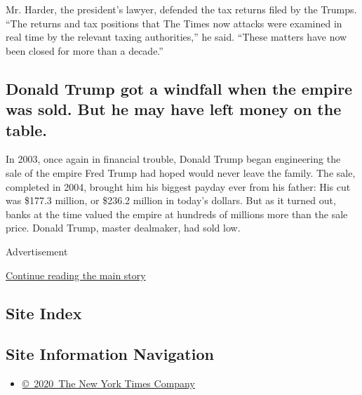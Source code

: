 Mr. Harder, the president's lawyer, defended the tax returns filed by
the Trumps. ``The returns and tax positions that The Times now attacks
were examined in real time by the relevant taxing authorities,'' he
said. ``These matters have now been closed for more than a decade.''

\hypertarget{donald-trump-got-a-windfall-when-the-empire-was-sold-but-he-may-have-left-money-on-the-table}{%
\subsection{Donald Trump got a windfall when the empire was sold. But he
may have left money on the
table.}\label{donald-trump-got-a-windfall-when-the-empire-was-sold-but-he-may-have-left-money-on-the-table}}

In 2003, once again in financial trouble, Donald Trump began engineering
the sale of the empire Fred Trump had hoped would never leave the
family. The sale, completed in 2004, brought him his biggest payday ever
from his father: His cut was \$177.3 million, or \$236.2 million in
today's dollars. But as it turned out, banks at the time valued the
empire at hundreds of millions more than the sale price. Donald Trump,
master dealmaker, had sold low.

Advertisement

\protect\hyperlink{after-bottom}{Continue reading the main story}

\hypertarget{site-index}{%
\subsection{Site Index}\label{site-index}}

\hypertarget{site-information-navigation}{%
\subsection{Site Information
Navigation}\label{site-information-navigation}}

\begin{itemize}
\tightlist
\item
  \href{https://help.nytimes.com/hc/en-us/articles/115014792127-Copyright-notice}{©~2020~The
  New York Times Company}
\end{itemize}

